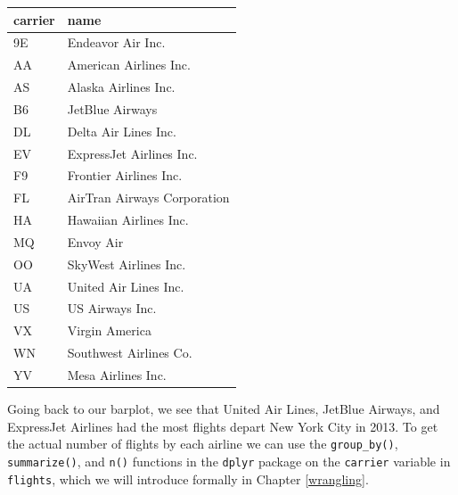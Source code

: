 \documentclass[12pt,]{krantz}
\makeatletter
\newenvironment{Shaded}{\begin{snugshade}}{\end{snugshade}}
\newcommand{\KeywordTok}[1]{\textcolor[rgb]{0.27,0.27,0.27}{\textbf{#1}}}
\newcommand{\DataTypeTok}[1]{\textcolor[rgb]{0.27,0.27,0.27}{#1}}
\newcommand{\StringTok}[1]{\textcolor[rgb]{0.5,0.5,0.5}{#1}}
\newcommand{\OperatorTok}[1]{\textcolor[rgb]{0.43,0.43,0.43}{\textbf{#1}}}
\newcommand{\NormalTok}[1]{#1}
\newenvironment{kframe}{%
\medskip{}
\setlength{\fboxsep}{.8em}
 \def\at@end@of@kframe{}%
 \ifinner\ifhmode%
  \def\at@end@of@kframe{\end{minipage}}%
  \begin{minipage}{\columnwidth}%
 \fi\fi%
 \def\FrameCommand##1{\hskip\@totalleftmargin \hskip-\fboxsep
 \colorbox{shadecolor}{##1}\hskip-\fboxsep
     \hskip-\linewidth \hskip-\@totalleftmargin \hskip\columnwidth}%
 \MakeFramed {\advance\hsize-\width
   \@totalleftmargin\z@ \linewidth\hsize
   \@setminipage}}%
 {\par\unskip\endMakeFramed%
 \at@end@of@kframe}
\renewenvironment{Shaded}{\begin{kframe}}{\end{kframe}}
\theoremstyle{definition}
\theoremstyle{definition}
\theoremstyle{definition}
\theoremstyle{remark}
\makeatother
\begin{document}
\begin{table}[H]
\centering\begingroup\fontsize{10}{12}\selectfont

\begin{tabular}{l|l}
\hline
carrier & name\\
\hline
9E & Endeavor Air Inc.\\
\hline
AA & American Airlines Inc.\\
\hline
AS & Alaska Airlines Inc.\\
\hline
B6 & JetBlue Airways\\
\hline
DL & Delta Air Lines Inc.\\
\hline
EV & ExpressJet Airlines Inc.\\
\hline
F9 & Frontier Airlines Inc.\\
\hline
FL & AirTran Airways Corporation\\
\hline
HA & Hawaiian Airlines Inc.\\
\hline
MQ & Envoy Air\\
\hline
OO & SkyWest Airlines Inc.\\
\hline
UA & United Air Lines Inc.\\
\hline
US & US Airways Inc.\\
\hline
VX & Virgin America\\
\hline
WN & Southwest Airlines Co.\\
\hline
YV & Mesa Airlines Inc.\\
\hline
\end{tabular}\endgroup{}
\end{table}

Going back to our barplot, we see that United Air Lines, JetBlue
Airways, and ExpressJet Airlines had the most flights depart New York
City in 2013. To get the actual number of flights by each airline we can
use the \texttt{group\_by()}, \texttt{summarize()}, and \texttt{n()}
functions in the \texttt{dplyr} package on the \texttt{carrier} variable
in \texttt{flights}, which we will introduce formally in Chapter
\ref{wrangling}.

\begin{Shaded}
\end{Shaded}
\end{document}
